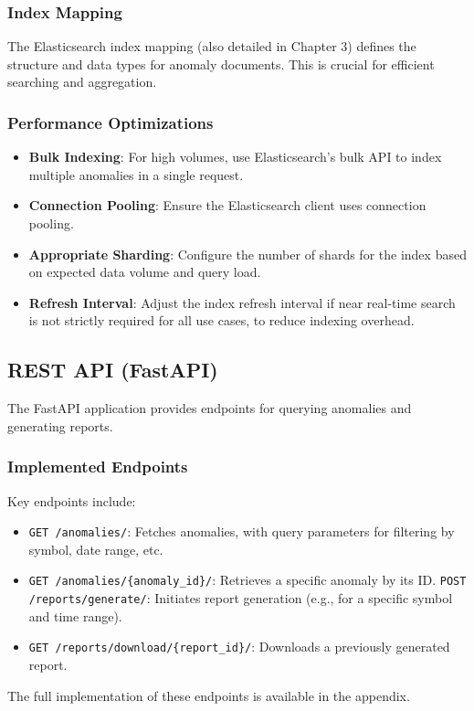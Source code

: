 \subsubsection{Index Mapping}
The Elasticsearch index mapping (also detailed in Chapter 3) defines the structure and data types for anomaly documents. This is crucial for efficient searching and aggregation.

\subsubsection{Performance Optimizations}
\begin{itemize}
    \item \textbf{Bulk Indexing}: For high volumes, use Elasticsearch's bulk API to index multiple anomalies in a single request.
    \item \textbf{Connection Pooling}: Ensure the Elasticsearch client uses connection pooling.
    \item \textbf{Appropriate Sharding}: Configure the number of shards for the index based on expected data volume and query load.
    \item \textbf{Refresh Interval}: Adjust the index refresh interval if near real-time search is not strictly required for all use cases, to reduce indexing overhead.
\end{itemize}
 

\subsection{REST API (FastAPI)}

The FastAPI application provides endpoints for querying anomalies and generating reports.

\subsubsection{Implemented Endpoints}
Key endpoints include:
\begin{itemize}
    \item \texttt{GET /anomalies/}: Fetches anomalies, with query parameters for filtering by symbol, date range, etc.
    \item \texttt{GET /anomalies/\{anomaly\_id\}/}: Retrieves a specific anomaly by its ID.
    \texttt{POST /reports/generate/}: Initiates report generation (e.g., for a specific symbol and time range).
    \item \texttt{GET /reports/download/\{report\_id\}/}: Downloads a previously generated report.
\end{itemize}
The full implementation of these endpoints is available in the appendix.

